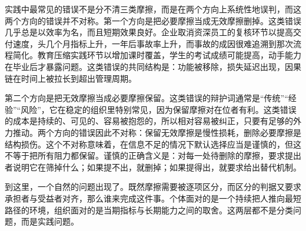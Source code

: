 
实践中最常见的错误不是分不清三类摩擦，而是在两个方向上系统性地误判，而这两个方向的错误并不对称。第一个方向是把必要摩擦当成无效摩擦删掉。这类错误几乎总是以效率为名，而且短期效果良好。企业取消资深员工的复核环节以提高交付速度，头几个月指标上升，一年后事故率上升，而事故的成因很难追溯到那次流程简化。教育压缩实践环节以增加课时覆盖，学生的考试成绩可能提高，动手能力在毕业后才暴露问题。这类错误的共同结构是：功能被移除，损失延迟出现，因果链在时间上被拉长到超出管理周期。

第二个方向是把无效摩擦当成必要摩擦保留。这类错误的辩护词通常是“传统”“经验”“风险”，它在稳定的组织里特别常见，因为保留摩擦对在位者有利。这类错误的成本是持续的、可见的、容易被抱怨的，所以相对容易被纠正，只要有足够的外力推动。两个方向的错误因此不对称：保留无效摩擦是慢性损耗，删除必要摩擦是结构损伤。这个不对称意味着，在信息不足的情况下默认选择应当是谨慎的，但这不等于把所有阻力都保留。谨慎的正确含义是：对每一处待删除的摩擦，要求提出者说明它在筛掉什么；如果提不出，就删掉；如果提得出，就要求给出替代机制。

到这里，一个自然的问题出现了。既然摩擦需要被逐项区分，而区分的判据又要求承担者与受益者对齐，那么谁来完成这件事。个体面对的是一个持续把人推向最短路径的环境，组织面对的是当期指标与长期能力之间的取舍。这两层都不是分类问题，而是实践问题。
